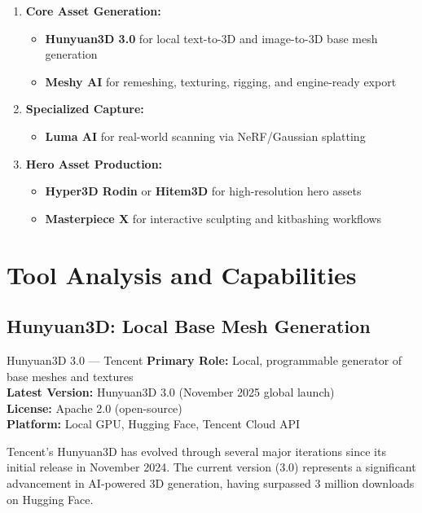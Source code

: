 \documentclass[11pt]{article}
\newcommand{\toolname}[1]{\textbf{#1}}
\begin{document}
\begin{enumerate}[leftmargin=2em]
  \item \textbf{Core Asset Generation:}
    \begin{itemize}
      \item \toolname{Hunyuan3D 3.0} for local text-to-3D and image-to-3D base mesh generation
      \item \toolname{Meshy AI} for remeshing, texturing, rigging, and engine-ready export
    \end{itemize}
  \item \textbf{Specialized Capture:}
    \begin{itemize}
      \item \toolname{Luma AI} for real-world scanning via NeRF/Gaussian splatting
    \end{itemize}
  \item \textbf{Hero Asset Production:}
    \begin{itemize}
      \item \toolname{Hyper3D Rodin} or \toolname{Hitem3D} for high-resolution hero assets
      \item \toolname{Masterpiece X} for interactive sculpting and kitbashing workflows
    \end{itemize}
\end{enumerate}

\section{Tool Analysis and Capabilities}

\subsection{Hunyuan3D: Local Base Mesh Generation}

\begin{toolbox}{Hunyuan3D 3.0 --- Tencent}
\textbf{Primary Role:} Local, programmable generator of base meshes and textures\\
\textbf{Latest Version:} Hunyuan3D 3.0 (November 2025 global launch)\\
\textbf{License:} Apache 2.0 (open-source)\\
\textbf{Platform:} Local GPU, Hugging Face, Tencent Cloud API
\end{toolbox}

Tencent's Hunyuan3D has evolved through several major iterations since its initial release in November 2024. The current version (3.0) represents a significant advancement in AI-powered 3D generation, having surpassed 3 million downloads on Hugging Face.
\end{document}
